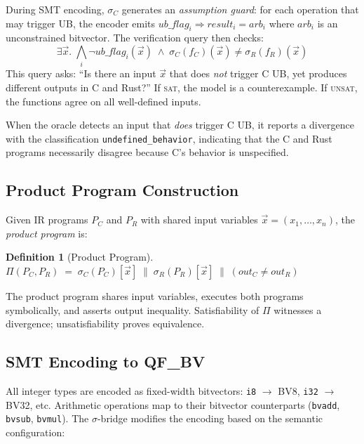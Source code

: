 \documentclass[11pt]{article}
\newtheorem{definition}[theorem]{Definition}
\newcommand{\sigbridge}{$\sigma$-bridge}
\newcommand{\qfbv}{\textsf{QF\_BV}}
\newcommand{\UNSAT}{\textsc{unsat}}
\newcommand{\SAT}{\textsc{sat}}
\begin{document}
During SMT encoding, $\sigma_C$ generates an \emph{assumption guard}:
for each operation that may trigger UB, the encoder emits
$\mathit{ub\_flag}_i \Rightarrow \mathit{result}_i = \mathit{arb}_i$
where $\mathit{arb}_i$ is an unconstrained bitvector.  The verification query
then checks:
\[
\exists \vec{x}.\;
\bigwedge_i \neg\mathit{ub\_flag}_i(\vec{x})
\;\wedge\;
\sigma_C(f_C)(\vec{x}) \neq \sigma_R(f_R)(\vec{x})
\]
This query asks: ``Is there an input $\vec{x}$ that does \emph{not} trigger
C UB, yet produces different outputs in C and Rust?''  If
\SAT{}, the model is a counterexample.  If \UNSAT{}, the functions agree on
all well-defined inputs.

When the oracle detects an input that \emph{does} trigger C UB, it reports a
divergence with the classification \texttt{undefined\_behavior}, indicating
that the C and Rust programs necessarily disagree because C's behavior is
unspecified.

\subsection{Product Program Construction}

Given IR programs $P_C$ and $P_R$ with shared input variables
$\vec{x} = (x_1, \ldots, x_n)$, the \emph{product program} is:

\begin{definition}[Product Program]\label{def:product}
$\Pi(P_C, P_R) \;=\; \sigma_C(P_C)[\vec{x}] \;\|\; \sigma_R(P_R)[\vec{x}]
\;\|\; (\mathit{out}_C \neq \mathit{out}_R)$
\end{definition}

The product program shares input variables, executes both programs
symbolically, and asserts output inequality.  Satisfiability of $\Pi$
witnesses a divergence; unsatisfiability proves equivalence.

\subsection{SMT Encoding to \qfbv{}}

All integer types are encoded as fixed-width bitvectors: \texttt{i8}
$\to$ \textsf{BV8}, \texttt{i32} $\to$ \textsf{BV32}, etc.  Arithmetic
operations map to their bitvector counterparts (\texttt{bvadd},
\texttt{bvsub}, \texttt{bvmul}).  The \sigbridge{} modifies the
encoding based on the semantic configuration:
\end{document}
